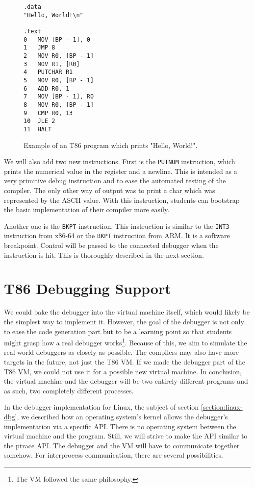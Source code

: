\begin{figure}
    \begin{lstlisting}
.data
"Hello, World!\n"

.text
0   MOV [BP - 1], 0
1   JMP 8
2   MOV R0, [BP - 1]
3   MOV R1, [R0]
4   PUTCHAR R1
5   MOV R0, [BP - 1]
6   ADD R0, 1
7   MOV [BP - 1], R0
8   MOV R0, [BP - 1]
9   CMP R0, 13
10  JLE 2
11  HALT
    \end{lstlisting}
    \caption{Example of an T86 program which prints "Hello, World!".}
    \label{fig:t86-program}
\end{figure}
We will also add two new instructions. First is the \texttt{PUTNUM}
instruction, which prints the numerical value in the register and a newline.
This is intended as a very primitive debug instruction and to ease the
automated testing of the compiler. The only other way of output was to print a
char which was represented by the ASCII value. With this instruction, students
can bootstrap the basic implementation of their compiler more easily.

Another one is the \texttt{BKPT} instruction. This instruction is similar to
the \texttt{INT3} instruction from x86-64 or the \texttt{BKPT} instruction from
ARM. It is a software breakpoint. Control will be passed to the connected
debugger when the instruction is hit. This is thoroughly described in the next
section. 

\section{T86 Debugging Support}
We could bake the debugger into the virtual machine itself, which would likely
be the simplest way to implement it. However, the goal of the debugger is not
only to ease the code generation part but to be a learning point so that
students might grasp how a real debugger works\footnote{The VM followed the
same philosophy.}. Because of this, we aim to simulate the real-world debuggers
as closely as possible. The compilers may also have more targets in the future,
not just the T86 VM. If we made the debugger part of the T86 VM, we could not
use it for a possible new virtual machine. In conclusion, the virtual machine
and the debugger will be two entirely different programs and as such, two
completely different processes.

In the debugger implementation for Linux, the subject of section
\ref{section:linux-dbg}, we described how an operating system's kernel allows
the debugger's implementation via a specific API. There is no operating system
between the virtual machine and the program. Still, we will strive to make the
API similar to the ptrace API. The debugger and the VM will have to communicate
together somehow. For interprocess communication, there are several
possibilities.


